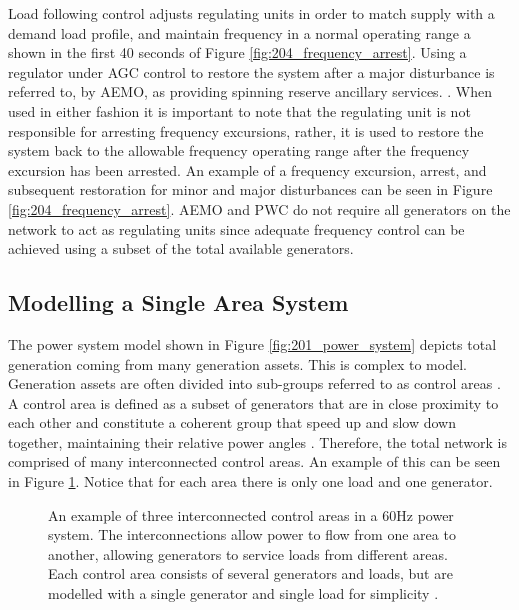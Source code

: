 \newpage

Load following control adjusts regulating units in order to match supply with a demand load profile, and maintain frequency in a normal operating range a shown in the first 40 seconds of Figure \ref{fig:204_frequency_arrest}. Using a regulator under AGC control to restore the system after a major disturbance is referred to, by AEMO, as providing spinning reserve ancillary services. \cite{AEMOancilliaryserv}. When used in either fashion it is important to note that the regulating unit is not responsible for arresting frequency excursions, rather, it is used to restore the system back to the allowable frequency operating range after the frequency excursion has been arrested. An example of a frequency excursion, arrest, and subsequent restoration for minor and major disturbances can be seen in Figure \ref{fig:204_frequency_arrest}. AEMO and PWC do not require all generators on the network to act as regulating units since adequate frequency control can be achieved using a subset of the total available generators.


\subsection{Modelling a Single Area System}\label{sec:modlling_a_single_area}
The power system model shown in Figure \ref{fig:201_power_system} depicts total generation coming from many generation assets. This is complex to model. Generation assets are often divided into sub-groups referred to as control areas \cite{Kothari2011}. A control area is defined as a subset of generators that are in close proximity to each other and constitute a coherent group that speed up and slow down together, maintaining their relative power angles \cite{Kothari2011}. Therefore, the total network is comprised of many interconnected control areas. An example of this can be seen in Figure \ref{fig:2105_multiple_area_system}. Notice that for each area there is only one load and one generator.
\begin{figure}[ht]
	\centering
	\resizebox{12cm}{!}{}
	\caption[Multiple area power system]{An example of three interconnected control areas in a 60$\si{\hertz}$ power system. The interconnections allow power to flow from one area to another, allowing generators to service loads from different areas. Each control area consists of several generators and loads, but are modelled with a single generator and single load for simplicity \cite{Grainger1994}.}
	\label{fig:2105_multiple_area_system}
\end{figure}

